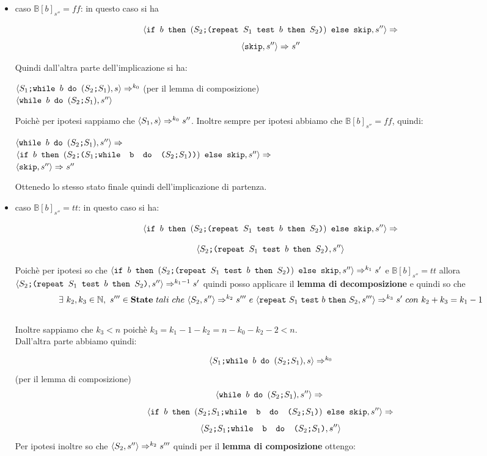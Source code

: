 {	\begin{itemize}
		\item caso $\mathbb{B}[b]_{s''}=ff$: in questo caso si ha 

		\[ \confSs{\ifABC{b}{(\concat{$S_2$}{(\repeatSbS{$S_1$}{$b$}{$S_2$})})}
		{\skipistr}}{s''}\Rar{} \]
		\[ \confSs{\skipistr}{s''}\Rar{}s'' \]

		Quindi dall'altra parte dell'implicazione si ha:
		\begin{center}
		$\confSs{\PDef{}}{s}\Rar{k_0}$ (per il lemma di composizione)\\
		$\confSs{\wbS{b}{(\concat{$S_2$}{$S_1$})}}{s''}$
		\end{center}
		Poichè per ipotesi sappiamo che $\confSs{S_1}{s}\Rar{k_0}s''$. Inoltre
		sempre per ipotesi abbiamo che $\mathbb{B}[b]_{s''}=ff$, quindi:
		\begin{center}
		$\confSs{\wbS{b}{(\concat{$S_2$}{$S_1$})}}{s''}\Rar{}$\\
		$\confSs{\ifABC{b}{(\concat{$S_2$}{(\concat{$S_1$}
		{\wbS{b}{(\concat{$S_2$}{$S_1$})}})})}{\skipistr}}{s''}\Rar{}$\\
		$\confSs{\skipistr}{s''}\Rar{}s''$
		\end{center}
		Ottenedo lo stesso stato finale quindi dell'implicazione di partenza.

		\item caso $\mathbb{B}[b]_{s''}=tt$: in questo caso si ha:

		\[ \confSs{\ifABC{b}{(\concat{$S_2$}{(\repeatSbS{$S_1$}{$b$}{$S_2$})})}
		{\skipistr}}{s''}\Rar{} \]
	
		\[ \confSs{\concat{$S_2$}{(\repeatSbS{$S_1$}{$b$}{$S_2$})}}{s''} \]

		Poichè per ipotesi so che $\confSs{\ifABC{b}{(\concat{$S_2$}
		{(\repeatSbS{$S_1$}{$b$}{$S_2$})})}{\skipistr}}{s''}\Rar{k_1}s'$ e 
		$\mathbb{B}[b]_{s''}=tt$ allora 
		$\confSs{\concat{$S_2$}{(\repeatSbS{$S_1$}{$b$}{$S_2$})}}{s''}
		\Rar{k_1-1}s'$ quindi posso applicare il \textbf{lemma di 
		decomposizione} e quindi so che
		\[ \exists{}~k_2,k_3\in{}\mathbb{N},~ s'''\in{}\states{}~tali~che~
		\confSs{S_2}{s''}\Rar{k_2}s'''~e~\confSs{\repeatSbS{S_1}{b}{S_2}}
		{s'''}\Rar{k_3}s'~con~k_2+k_3=k_1-1 \] \\
		Inoltre sappiamo che $k_3<n$ poichè $k_3=k_1-1-k_2=n-k_0-k_2-2<n$.\\
		Dall'altra parte abbiamo quindi:
	
		\[ \confSs{\PDef{}}{s}\Rar{k_0}\] (per il lemma di composizione)\\
		\[\confSs{\wbS{b}{(\concat{$S_2$}{$S_1$})}}{s''}\Rar{}\\ \]
		\[\confSs{\ifABC{b}{(\concat{\concat{$S_2$}{$S_1$}}
		{\wbS{b}{(\concat{$S_2$}{$S_1$})}})}{\skipistr}}{s''}\Rar{}\]
		\[\confSs{\concat{\concat{$S_2$}{$S_1$}}
		{\wbS{b}{(\concat{$S_2$}{$S_1$})}}}{s''}\]
		Per ipotesi inoltre so che $\confSs{S_2}{s''}\Rar{k_2}s'''$ quindi per
		il \textbf{lemma di composizione} ottengo:
	

\end{itemize}}
